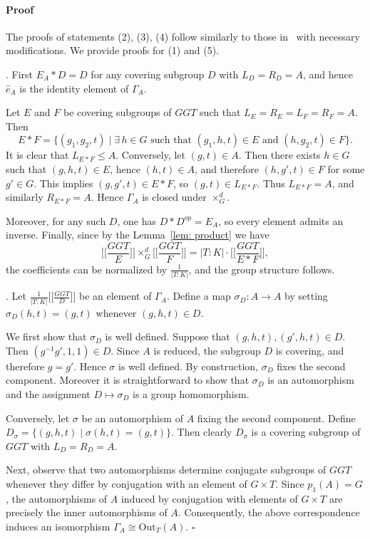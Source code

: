 \documentclass[12pt]{article}
\theoremstyle{change}
\newenvironment{proof}{\paragraph{Proof}}{\hfill$\square$}
\newcommand{\Out}{\mathrm{Out}}
\newcommand{\1}{{\bf 1}}
\begin{document}
\begin{proof}
The proofs of statements (2), (3), (4) follow similarly to those in~\cite[Section 6.1]{BC} with necessary modifications. We provide proofs for (1) and (5).

\smallskip

. First $E_A * D = D$ for any covering subgroup $D$ with $L_D = R_D = A$, and hence $\widehat{e}_A$ is the identity element of $\Gamma_A$.

Let $E$ and $F$ be covering subgroups of $GGT$ such that $L_E = R_E = L_F = R_F = A$. Then
\[
E*F = \{(g_1,g_2,t)\mid \exists\, h \in G \text{ such that } (g_1,h,t)\in E \text{ and } (h,g_2,t)\in F\}.
\]
It is clear that $L_{E*F} \leq A$. Conversely, let $(g,t)\in A$. Then there exists $h \in G$ such that $(g,h,t)\in E$, hence $(h,t)\in A$, and therefore $(h,g',t)\in F$ for some $g'\in G$. This implies $(g,g',t)\in E*F$, so $(g,t)\in L_{E*F}$. Thus $L_{E*F} = A$, and similarly $R_{E*F} = A$. Hence $\Gamma_A$ is closed under $\times_G^d$.

Moreover, for any such $D$, one has $D * D^{op} = E_A$, so every element admits an inverse. Finally, since by the Lemma~\ref{lem: product} we have   
\[
\Big[\Big[\frac{GGT}{E}\Big]\Big]\times_G^d \Big[\Big[\frac{GGT}{F}\Big]\Big]
= |T:K| \cdot \Big[\Big[\frac{GGT}{E*F}\Big]\Big],
\]
the coefficients can be normalized by $\frac{1}{|T:K|}$, and the group structure follows.

\smallskip

. Let
\(
\frac{1}{|T:K|}\Big[\Big[\frac{GGT}{D}\Big]\Big]
\)
be an element of \(\Gamma_A\). Define a map
\(
\sigma_D \colon A \to A
\)
by setting
\(
\sigma_D(h,t)=(g,t)
\)
whenever \((g,h,t)\in D\).

We first show that \(\sigma_D\) is well defined. Suppose that
\(
(g,h,t),(g',h,t)\in D.
\)
Then
\(
(g^{-1}g',1,1)\in D.
\)
Since \(A\) is reduced, the subgroup \(D\) is covering, and therefore \(g=g'\). Hence \(\sigma\) is well defined. By construction, \(\sigma_D\) fixes the second component. Moreover it is straightforward to show that $\sigma_D$ is an automorphism and the assignment $D\mapsto \sigma_D$ is a group homomorphism. 

Conversely, let \(\sigma\) be an automorphism of \(A\) fixing the second component. Define $D_{\sigma}=\{(g,h,t)\mid \sigma(h,t)=(g,t)\}$.
Then clearly \(D_{\sigma}\) is a covering subgroup of \(GGT\) with $L_D = R_D = A$.

Next, observe that two automorphisms determine conjugate subgroups of \(GGT\) whenever they differ by conjugation with an element of \(G\times T\). Since \(p_1(A)=G\), the automorphisms of \(A\) induced by conjugation with elements of \(G\times T\) are precisely the inner automorphisms of \(A\). Consequently, the above correspondence induces an isomorphism $\Gamma_A \cong \Out_T(A)$.
\end{proof}
\end{document}
